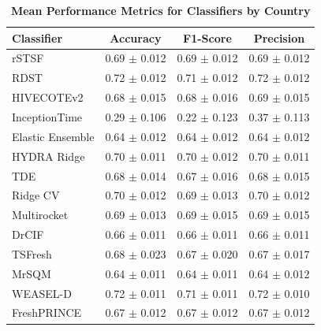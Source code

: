 \documentclass{ieeeaccess}
\begin{document}
    \begin{table}[!h]
        \caption{\textbf{Mean Performance Metrics for Classifiers by Country}}
        \label{tab:mean_results_country}
        \centering
        \setlength{\tabcolsep}{3pt}
        \begin{tabular}{|l|c|c|c|}
        \hline
        \textbf{Classifier} & \textbf{Accuracy} & \textbf{F1-Score} & \textbf{Precision} \\ 
        \hline
        rSTSF & 0.69 $\pm$ 0.012 & 0.69 $\pm$ 0.012 & 0.69 $\pm$ 0.012 \\ 
        RDST & 0.72 $\pm$ 0.012 & 0.71 $\pm$ 0.012 & 0.72 $\pm$ 0.012 \\ 
        HIVECOTEv2 & 0.68 $\pm$ 0.015 & 0.68 $\pm$ 0.016 & 0.69 $\pm$ 0.015 \\ 
        InceptionTime & 0.29 $\pm$ 0.106 & 0.22 $\pm$ 0.123 & 0.37 $\pm$ 0.113 \\ 
        Elastic Ensemble & 0.64 $\pm$ 0.012 & 0.64 $\pm$ 0.012 & 0.64 $\pm$ 0.012 \\ 
        HYDRA Ridge & 0.70 $\pm$ 0.011 & 0.70 $\pm$ 0.012 & 0.70 $\pm$ 0.011 \\ 
        TDE & 0.68 $\pm$ 0.014 & 0.67 $\pm$ 0.016 & 0.68 $\pm$ 0.015 \\ 
        Ridge CV & 0.70 $\pm$ 0.012 & 0.69 $\pm$ 0.013 & 0.70 $\pm$ 0.012 \\ 
        Multirocket & 0.69 $\pm$ 0.013 & 0.69 $\pm$ 0.015 & 0.69 $\pm$ 0.015 \\ 
        DrCIF & 0.66 $\pm$ 0.011 & 0.66 $\pm$ 0.011 & 0.66 $\pm$ 0.011 \\ 
        TSFresh & 0.68 $\pm$ 0.023 & 0.67 $\pm$ 0.020 & 0.67 $\pm$ 0.017 \\ 
        MrSQM & 0.64 $\pm$ 0.011 & 0.64 $\pm$ 0.011 & 0.64 $\pm$ 0.012 \\ 
        WEASEL-D & 0.72 $\pm$ 0.011 & 0.71 $\pm$ 0.011 & 0.72 $\pm$ 0.010 \\ 
        FreshPRINCE & 0.67 $\pm$ 0.012 & 0.67 $\pm$ 0.012 & 0.67 $\pm$ 0.012 \\ 
        \hline
        \end{tabular}
    \end{table}
    
\end{document}

